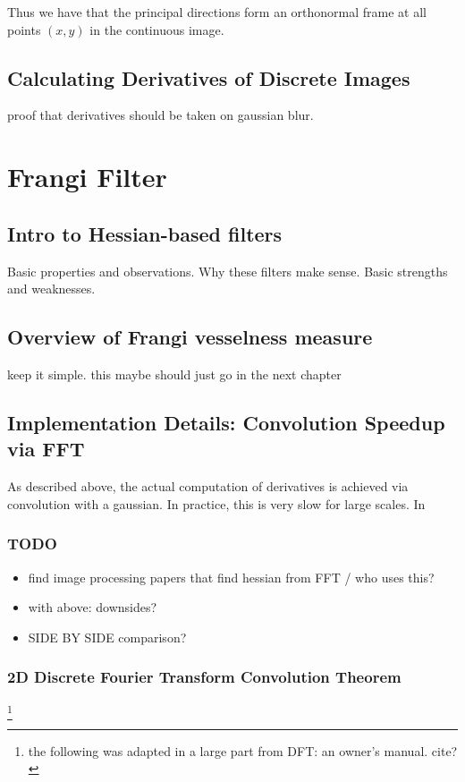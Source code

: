 	Thus we have that the principal directions form an orthonormal frame at all points $(x,y)$ in the continuous image.
	\subsection{Calculating Derivatives of Discrete Images} 
	proof that derivatives should be taken on gaussian blur.
	\section{Frangi Filter}
	\subsection{Intro to Hessian-based filters}
	Basic properties and observations. Why these filters make sense. Basic strengths and weaknesses.
	\subsection{Overview of Frangi vesselness measure} keep it simple. this maybe should just go in the next chapter
	\subsection{Implementation Details: Convolution Speedup via FFT}
	As described above, the actual computation of derivatives is achieved via convolution with a gaussian. In practice, this is very slow for large scales. In 
		\subsubsection{TODO}
		\begin{itemize}
			\item find image processing papers that find hessian from FFT / who uses this?
			\item with above: downsides?
			\item SIDE BY SIDE comparison?
		\end{itemize}
		
		\subsubsection{2D Discrete Fourier Transform Convolution Theorem}\footnote{the following was adapted in a large part from DFT: an owner's manual. cite?}
		
